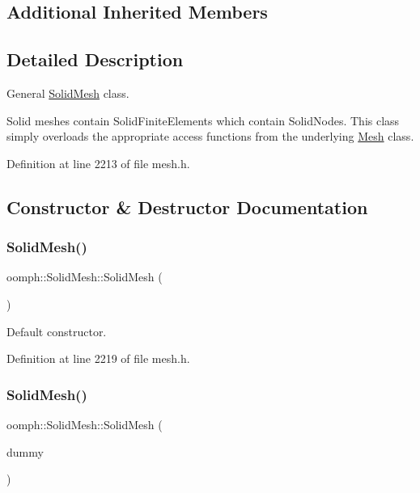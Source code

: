 \subsection*{Additional Inherited Members}


\subsection{Detailed Description}
General \hyperlink{classoomph_1_1SolidMesh}{Solid\+Mesh} class. 

Solid meshes contain Solid\+Finite\+Elements which contain Solid\+Nodes. This class simply overloads the appropriate access functions from the underlying \hyperlink{classoomph_1_1Mesh}{Mesh} class. 

Definition at line 2213 of file mesh.\+h.



\subsection{Constructor \& Destructor Documentation}
\mbox{\label{classoomph_1_1SolidMesh_a3b6da67f7de6bc1a617865729cbf8ad0}} 
\subsubsection{\texorpdfstring{Solid\+Mesh()}{SolidMesh()}\hspace{0.1cm}{\footnotesize\ttfamily [1/3]}}
{\footnotesize\ttfamily oomph\+::\+Solid\+Mesh\+::\+Solid\+Mesh (\begin{DoxyParamCaption}{ }\end{DoxyParamCaption})\hspace{0.3cm}{\ttfamily [inline]}}



Default constructor. 



Definition at line 2219 of file mesh.\+h.

\mbox{\label{classoomph_1_1SolidMesh_a2db1ac9609ffd7d211e662d5edb2ebc9}} 
\subsubsection{\texorpdfstring{Solid\+Mesh()}{SolidMesh()}\hspace{0.1cm}{\footnotesize\ttfamily [2/3]}}
{\footnotesize\ttfamily oomph\+::\+Solid\+Mesh\+::\+Solid\+Mesh (\begin{DoxyParamCaption}\item[{const \hyperlink{classoomph_1_1SolidMesh}{Solid\+Mesh} \&}]{dummy }\end{DoxyParamCaption})\hspace{0.3cm}{\ttfamily [inline]}}



